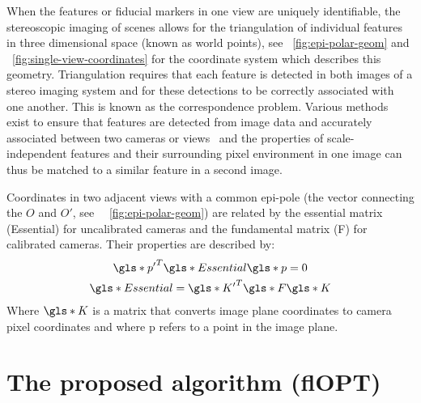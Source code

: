 \documentclass{osa-article}
\begin{document}


When the features or fiducial markers in one view are uniquely identifiable, the stereoscopic imaging of scenes allows for the triangulation of individual features in three dimensional space (known as world points), see \figurename~\ref{fig:epi-polar-geom} and \figurename~\ref{fig:single-view-coordinates} for the coordinate system which describes this geometry. %
Triangulation requires that each feature is detected in both images of a stereo imaging system and for these detections to be correctly associated with one another.
This is known as the correspondence problem.
Various methods exist to ensure that features are detected from image data and accurately associated between two cameras or views~\cite{szeliskiComputerVisionAlgorithms2010} and the properties of scale-independent features and their surrounding pixel environment in one image can thus be matched to a similar feature in a second image.

Coordinates in two adjacent views with a common epi-pole (the vector connecting the \(O\) and \(O'\), see \figurename~~\ref{fig:epi-polar-geom}) are related by the essential matrix (\gls*{Essential}) for uncalibrated cameras and the fundamental matrix (\gls*{F}) for calibrated cameras.
Their properties are described by:
\begin{gather}
  \gls*{p'}^T \gls*{Essential} \gls*{p} = 0 \label{eq:pEp}\\
  \gls*{Essential} = \gls*{K'}^T \gls*{F} \gls*{K} %
\end{gather}
Where \(\gls*{K}\) is a matrix that converts image plane coordinates to camera pixel coordinates and where \gls*{p} refers to a point in the image plane.

\section*{The proposed algorithm (flOPT)}
\end{document}
